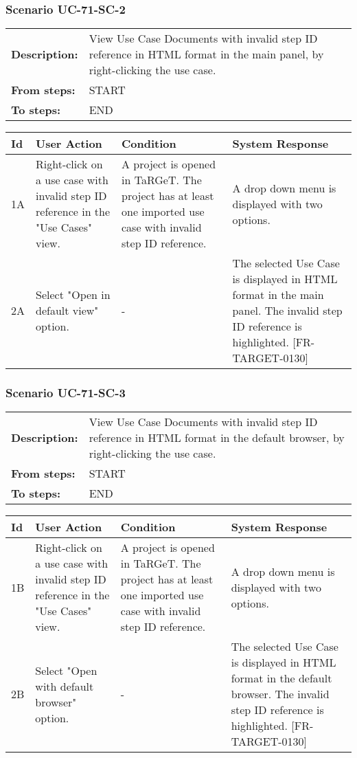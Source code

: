 \documentclass[a4paper,11pt]{article}
\newcommand{\bl}{\\ \hline}
\begin{document}
\subsubsection*{Scenario UC-71-SC-2}
\begin{tabular}{p{1in}p{4in}}
{\bf Description:} & View Use Case Documents with invalid step ID reference in HTML format in the main panel, by right-clicking the use case. \\
{\bf From steps:} & START \\
{\bf To steps:} & END \\
\end{tabular}
 
\begin{tabular}{|p{0.8in}|p{1.6in}|p{1.6in}|p{1.6in}|}
\hline
Id & User Action & Condition & System Response  \bl 
1A & Right-click on a use case with invalid step ID reference in the "Use Cases" view. & A project is opened in TaRGeT. The project has at least one imported use case with invalid step ID reference. & A drop down menu is displayed with two options. \bl 
2A & Select "Open in default view" option. & - & The selected Use Case is displayed in HTML format in the main panel. The invalid step ID reference is highlighted. [FR-TARGET-0130] \bl 
\end{tabular}
\subsubsection*{Scenario UC-71-SC-3}
\begin{tabular}{p{1in}p{4in}}
{\bf Description:} & View Use Case Documents with invalid step ID reference in HTML format in the default browser, by right-clicking the use case. \\
{\bf From steps:} & START \\
{\bf To steps:} & END \\
\end{tabular}
 
\begin{tabular}{|p{0.8in}|p{1.6in}|p{1.6in}|p{1.6in}|}
\hline
Id & User Action & Condition & System Response  \bl 
1B & Right-click on a use case with invalid step ID reference in the "Use Cases" view. & A project is opened in TaRGeT. The project has at least one imported use case with invalid step ID reference. & A drop down menu is displayed with two options. \bl 
2B & Select "Open with default browser" option. & - & The selected Use Case is displayed in HTML format in the default browser. The invalid step ID reference is highlighted.  [FR-TARGET-0130] \bl 
\end{tabular}
\end{document}
